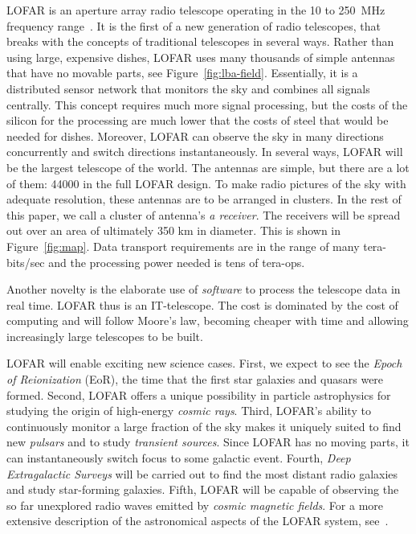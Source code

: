 \documentclass{article}
\begin{document}
LOFAR is an aperture array radio telescope operating in the
10 to 250~MHz frequency range~\cite{deVos:09}.  It is the first of a new generation of
radio telescopes, that breaks with the concepts of traditional
telescopes in several ways.  Rather than using large, expensive
dishes, LOFAR uses many thousands of simple antennas that have no
movable parts, see
Figure~\ref{fig:lba-field}.  Essentially, it is a distributed sensor
network that monitors the sky and combines all signals centrally.
This concept requires much more signal processing, but the 
costs of the silicon for the processing are much lower that the costs of steel that would
be needed for dishes. Moreover, LOFAR can observe the sky in many
directions concurrently and switch directions instantaneously.  In
several ways, LOFAR will be the largest telescope of the world.
The antennas are simple, but there are a lot of them: 44000 in the full LOFAR
design. To make radio pictures of the sky with adequate resolution,
these antennas are to be arranged in clusters.
In the rest of this paper, we call a cluster of antenna's \emph{a receiver}.
The receivers will be spread out over
an area of ultimately 350 km in diameter. This is shown in Figure~\ref{fig:map}.
Data transport requirements are in the range of many
tera-bits/sec and the processing power needed is tens of tera-ops.

Another novelty is the elaborate
use of \emph{software\/} to process the telescope data in real time.
LOFAR thus is an IT-telescope. 
The cost
is dominated by the cost of computing and will follow Moore's law,
becoming cheaper with time and allowing increasingly large telescopes
to be built. 

LOFAR will enable exciting new science cases.  First, we expect to see
the \emph{Epoch of Reionization\/} (EoR), the time that the first star
galaxies and quasars were formed. Second, LOFAR offers a unique
possibility in particle astrophysics for studying the origin of
high-energy \emph{cosmic rays}.  Third, LOFAR's ability to
continuously monitor a large fraction of the sky makes it uniquely
suited to find new \emph{pulsars} and to study \emph{transient
  sources}.  Since LOFAR has no moving parts, it can instantaneously
switch focus to some galactic event.  Fourth, \emph{Deep Extragalactic
  Surveys\/} will be carried out to find the most distant radio
galaxies and study star-forming galaxies.  Fifth, LOFAR will be
capable of observing the so far unexplored radio waves emitted by
\emph{cosmic magnetic fields}.  For a more extensive description of
the astronomical aspects of the LOFAR system, see~\cite{lofar}.
\end{document}
